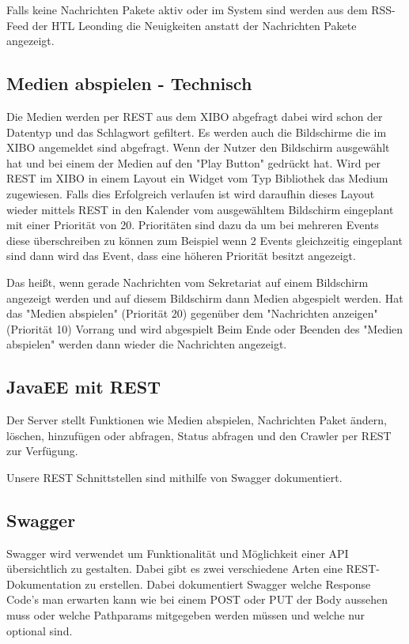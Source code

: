 Falls keine Nachrichten Pakete aktiv oder im System sind werden aus dem RSS-Feed der HTL Leonding die Neuigkeiten anstatt der Nachrichten Pakete angezeigt.

\subsection{Medien abspielen - Technisch}\label{sec:playmediatechnical}
Die Medien werden per REST aus dem XIBO abgefragt dabei wird schon der Datentyp und das Schlagwort gefiltert. Es werden auch die Bildschirme die im XIBO angemeldet sind abgefragt. Wenn der Nutzer den Bildschirm ausgewählt hat und bei einem der Medien auf den "Play Button" gedrückt hat. Wird per REST im XIBO in einem Layout ein Widget vom Typ Bibliothek das Medium zugewiesen. Falls dies Erfolgreich verlaufen ist wird daraufhin dieses Layout wieder mittels REST in den Kalender vom ausgewähltem Bildschirm eingeplant mit einer Priorität von 20. Prioritäten sind dazu da um bei mehreren Events diese überschreiben zu können zum Beispiel wenn 2 Events gleichzeitig eingeplant sind dann wird das Event, dass eine höheren Priorität besitzt angezeigt.

Das heißt, wenn gerade Nachrichten vom Sekretariat auf einem Bildschirm angezeigt werden und auf diesem Bildschirm dann Medien abgespielt werden. Hat das "Medien abspielen" (Priorität 20) gegenüber dem "Nachrichten anzeigen" (Priorität 10) Vorrang und wird abgespielt Beim Ende oder Beenden des "Medien abspielen" werden dann wieder die Nachrichten angezeigt.

\subsection{JavaEE mit REST}\label{sec:javaeeresttechnical}
Der Server stellt Funktionen wie Medien abspielen, Nachrichten Paket ändern, löschen, hinzufügen oder abfragen, Status abfragen und den Crawler per REST zur Verfügung.

Unsere REST Schnittstellen sind mithilfe von Swagger dokumentiert. \pageref{sec:javaeeandroidrestswagger}

\subsection{Swagger}\label{sec:javaeeandroidrestswagger}
Swagger wird verwendet um Funktionalität und Möglichkeit einer API übersichtlich zu gestalten. Dabei gibt es zwei verschiedene Arten eine REST-Dokumentation zu erstellen.
Dabei dokumentiert Swagger welche Response Code's man erwarten kann wie bei einem POST oder PUT der Body aussehen muss oder welche Pathparams mitgegeben werden müssen und welche nur optional sind.  

